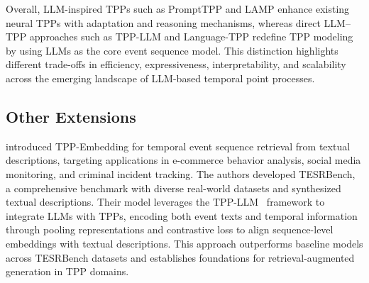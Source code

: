 \documentclass[10pt]{article} %
\begin{document}
Overall, LLM-inspired TPPs such as PromptTPP and LAMP enhance existing neural TPPs with adaptation and reasoning mechanisms, whereas direct LLM–TPP approaches such as TPP-LLM and Language-TPP redefine TPP modeling by using LLMs as the core event sequence model. This distinction highlights different trade-offs in efficiency, expressiveness, interpretability, and scalability across the emerging landscape of LLM-based temporal point processes. 







\subsection{Other Extensions}
\label{retrieval}
\citet{liu2025retrieval} introduced TPP-Embedding for temporal event sequence retrieval from textual descriptions, targeting applications in e-commerce behavior analysis, social media monitoring, and criminal incident tracking. The authors developed {TESRBench}, a comprehensive benchmark with diverse real-world datasets and synthesized textual descriptions. Their model leverages the TPP-LLM~\citep{liu2024tpp} framework to integrate LLMs with TPPs, encoding both event texts and temporal information through pooling representations and contrastive loss to align sequence-level embeddings with textual descriptions. This approach outperforms baseline models across TESRBench datasets and establishes foundations for retrieval-augmented generation in TPP domains.
\end{document}
